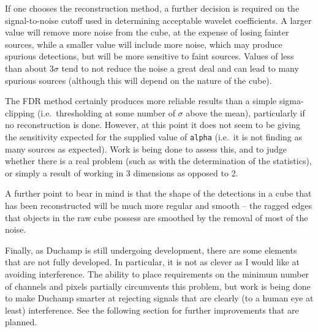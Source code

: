 \documentclass[12pt,a4paper]{article}
\newcommand{\ie}{i.e.\ }
\begin{document}
If one chooses the reconstruction method, a further decision is
required on the signal-to-noise cutoff used in determining acceptable
wavelet coefficients. A larger value will remove more noise from the
cube, at the expense of losing fainter sources, while a smaller value
will include more noise, which may produce spurious detections, but
will be more sensitive to faint sources. Values of less than about
$3\sigma$ tend to not reduce the noise a great deal and can lead to
many spurious sources (although this will depend on the nature of the
cube).

The FDR method certainly produces more reliable results than a simple
sigma-clipping (\ie thresholding at some number of $\sigma$ above the
mean), particularly if no reconstruction is done. However, at this
point it does not seem to be giving the sensitivity expected for the
supplied value of {\tt alpha} (\ie it is not finding as many sources
as expected). Work is being done to assess this, and to judge whether
there is a real problem (such as with the determination of the
statistics), or simply a result of working in 3 dimensions as opposed
to 2.

A further point to bear in mind is that the shape of the detections in
a cube that has been reconstructed will be much more regular and
smooth -- the ragged edges that objects in the raw cube possess are
smoothed by the removal of most of the noise.

Finally, as Duchamp is still undergoing development, there are some
elements that are not fully developed. In particular, it is not as
clever as I would like at avoiding interference. The ability to place
requirements on the minimum number of channels and pixels partially
circumvents this problem, but work is being done to make Duchamp
smarter at rejecting signals that are clearly (to a human eye at
least) interference. See the following section for further
improvements that are planned.
\end{document}
